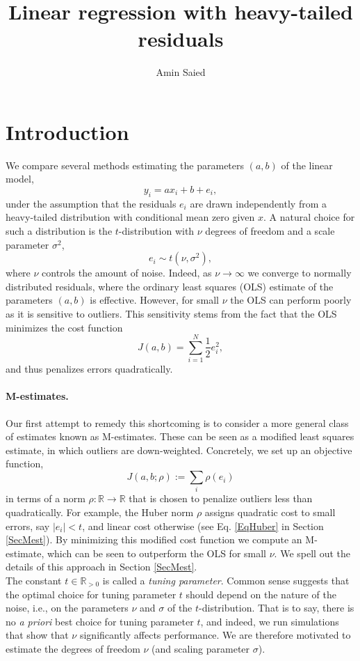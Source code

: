 \documentclass[11pt, a4 paper]{article}
\title{Linear regression with heavy-tailed residuals}
\author{Amin Saied}
\begin{document}
\setlength{\parindent}{0pt}
\maketitle

\section{Introduction}
We compare several methods estimating the parameters $(a, b)$ of the linear model,
\[
y_i = ax_i + b + e_i,
\]
under the assumption that the residuals $e_i$ are drawn independently from a heavy-tailed distribution with conditional mean zero given $x$. A natural choice for such a distribution is the $t$-distribution with $\nu$ degrees of freedom and a scale parameter $\sigma^2$,
\[
e_i \sim t(\nu, \sigma^2),
\]
where $\nu$ controls the amount of noise. Indeed, as $\nu \rightarrow \infty$ we converge to normally distributed residuals, where the ordinary least squares (OLS) estimate of the parameters $(a,b)$ is effective. However, for small $\nu$ the OLS can perform poorly as it is sensitive to outliers. This sensitivity stems from the fact that the OLS minimizes the cost function
\[
J(a, b) = \sum_{i=1}^N \frac{1}{2}e_i^2,
\]
and thus penalizes errors quadratically.

\paragraph{M-estimates.}
Our first attempt to remedy this shortcoming is to consider a more general class of estimates known as M-estimates. These can be seen as a modified least squares estimate, in which outliers are down-weighted. Concretely, we set up an objective function,
\begin{equation}
J(a,b; \rho):= \sum_i \rho(e_i)
\end{equation}
in terms of a norm $\rho:\mathbb{R}\rightarrow\mathbb{R}$ that is chosen to penalize outliers less than quadratically. For example, the Huber norm $\rho$ assigns quadratic cost to small errors, say $|e_i|<t$, and linear cost otherwise (see Eq. \ref{EqHuber} in Section \ref{SecMest}). By minimizing this modified cost function we compute an M-estimate, which can be seen to outperform the OLS for small $\nu$. We spell out the details of this approach in Section \ref{SecMest}.\\


The constant $t \in \mathbb{R}_{>0}$ is called a \emph{tuning parameter}. Common sense suggests that the optimal choice for tuning parameter $t$ should depend on the nature of the noise, i.e., on the parameters $\nu$ and $\sigma$ of the $t$-distribution. That is to say, there is no \emph{a priori} best choice for tuning parameter $t$, and indeed, we run simulations that show that $\nu$ significantly affects performance. We are therefore motivated to estimate the degrees of freedom $\nu$ (and scaling parameter $\sigma$).
\end{document}
